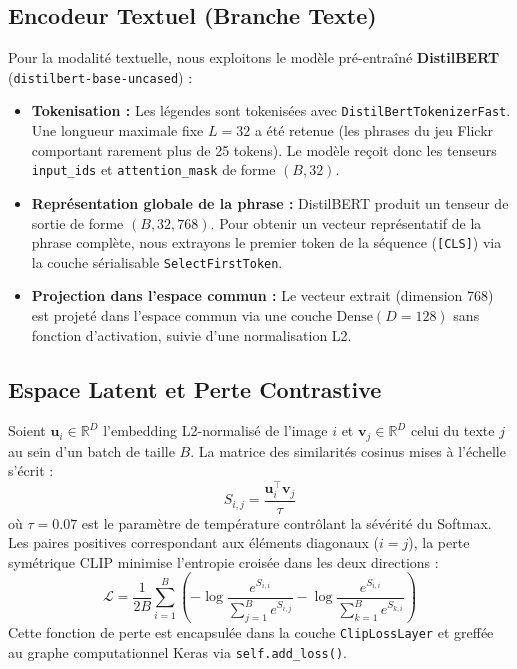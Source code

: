 \documentclass[12pt,a4paper]{article}
\begin{document}
\subsection{Encodeur Textuel (Branche Texte)}
Pour la modalité textuelle, nous exploitons le modèle pré-entraîné \textbf{DistilBERT} (\texttt{distilbert-base-uncased}) :
\begin{itemize}
    \item \textbf{Tokenisation :} Les légendes sont tokenisées avec \texttt{DistilBertTokenizerFast}. Une longueur maximale fixe $L = 32$ a été retenue (les phrases du jeu Flickr comportant rarement plus de 25 tokens). Le modèle reçoit donc les tenseurs \texttt{input\_ids} et \texttt{attention\_mask} de forme $(B, 32)$.
    \item \textbf{Représentation globale de la phrase :} DistilBERT produit un tenseur de sortie de forme $(B, 32, 768)$. Pour obtenir un vecteur représentatif de la phrase complète, nous extrayons le premier token de la séquence (\texttt{[CLS]}) via la couche sérialisable \texttt{SelectFirstToken}.
    \item \textbf{Projection dans l'espace commun :} Le vecteur extrait (dimension 768) est projeté dans l'espace commun via une couche $\text{Dense}(D=128)$ sans fonction d'activation, suivie d'une normalisation L2.
\end{itemize}

\subsection{Espace Latent et Perte Contrastive}
Soient $\mathbf{u}_i \in \mathbb{R}^D$ l'embedding L2-normalisé de l'image $i$ et $\mathbf{v}_j \in \mathbb{R}^D$ celui du texte $j$ au sein d'un batch de taille $B$. La matrice des similarités cosinus mises à l'échelle s'écrit :
\begin{equation}
    S_{i,j} = \frac{\mathbf{u}_i^\top \mathbf{v}_j}{\tau}
\end{equation}
où $\tau = 0.07$ est le paramètre de température contrôlant la sévérité du Softmax. Les paires positives correspondant aux éléments diagonaux ($i = j$), la perte symétrique CLIP minimise l'entropie croisée dans les deux directions :
\begin{equation}
    \mathcal{L} = \frac{1}{2B} \sum_{i=1}^B \left( -\log \frac{e^{S_{i,i}}}{\sum_{j=1}^B e^{S_{i,j}}} -\log \frac{e^{S_{i,i}}}{\sum_{k=1}^B e^{S_{k,i}}} \right)
\end{equation}
Cette fonction de perte est encapsulée dans la couche \texttt{ClipLossLayer} et greffée au graphe computationnel Keras via \texttt{self.add\_loss()}.
\end{document}
